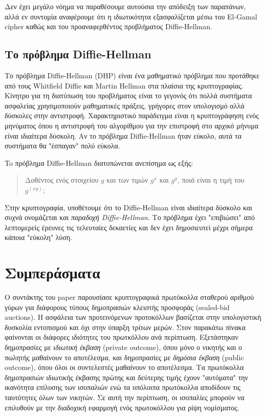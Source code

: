 \documentclass[letterpaper,11pt]{article}
\begin{document}
Δεν έχει μεγάλο νόημα να παραθέσουμε αυτούσια την απόδειξη των παραπάνων, αλλά εν συντομία αναφέρουμε ότι η ιδιωτικότητα εξασφαλίζεται μέσω του
El-Gamal cipher καθώς και του προαναφερθέντος προβλήματος Diffie-Hellman.

\subsection{Το πρόβλημα Diffie-Hellman}

Το πρόβλημα Diffie-Hellman (DHP) είναι ένα μαθηματικό πρόβλημα που προτάθηκε από τους Whitfield Diffie και Martin Hellman στα πλαίσια της
κρυπτογραφίας. Κίνητρο για τη διατύπωση του προβλήματος είναι το γεγονός ότι πολλά συστήματα ασφαλείας χρησιμοποιούν μαθηματικές πράξεις, γρήγορες
στον υπολογισμό αλλά δύσκολες στην αντιστροφή. Χαρακτηριστικό παράδειγμα είναι η κρυπτογράφηση ενός μηνύματος όπου η αντιστροφή του αλγορίθμου για
την επιστροφή στο αρχικό μήνυμα είναι ιδιαίτερα δύσκολη. Αν το πρόβλημα Diffie-Hellman ήταν εύκολο, αυτά τα συστήματα θα "έσπαγαν" πολύ εύκολα.

To πρόβλημα Diffie-Hellman διατυπώνεται ανεπίσημα ως εξής:

 \begin{quote} Δοθέντος ενός στοιχείου $g$ και των τιμών $g^x$ και $g^y$, ποιά είναι η τιμή του $g^(xy)$; \end{quote}

Στην κρυπτογραφία, υποθέτουμε ότι το Diffie-Hellman είναι ιδιαίτερα δύσκολο και συχνά ονομάζεται και \emph{παραδοχή Diffie-Hellman}. Το πρόβλημα
έχει "επιβιώσει" από λεπτομερείς έρευνες τις τελευταίες δεκαετίες και δεν έχει δημοσιευτεί μέχρι σήμερα κάποια "εύκολη" λύση.

	
\section{Συμπεράσματα} Ο συντάκτης του paper παρουσίασε κρυπτογραφικά πρωτόκολλα σταθερού αριθμού γύρων για διάφορους τύπους δημοπρασιών κλειστής
προσφοράς (sealed-bid auctions). Η ασφάλεια των προτεινόμενων προτοκόλλων βασίζεται στην υπολογιστική δυσκολία εντοπισμού και όχι στην ύπαρξη
τρίτων μερών. Στον παρακάτω πίνακα φαίνονται οι διάφορες ιδιότητες του πρωτκόλλου ανά περίπτωση. Εξετάστηκαν δημοπρασίες με \emph{ιδιωτική έκβαση}
(private outcome), όπου μόνο ο νικητής και ο πωλητής μαθαίνουν το αποτέλεσμα, και δημοπρασίες με \emph{δημόσια έκβαση} (public outcome), όπου όλοι
οι συντελεστές μαθαίνουν το αποτέλεσμα. Τα πρωτόκολλα δημοπρασιών ιδιωτικής έκβασης πρώτης και δεύτερης τιμής έχουν "αυτόματα" την ικανότητα
επίλυσης των ισοπαλιών ενώ τα υπόλοιπα πρωτόκολλα αποδίδουν τις ταυτότητες όλων των νικητών. Σε αυτή την περίπτωση, οι ισοπαλίες μπορούν να
επιλυθούν με την διαδοχική εφαρμογή ενός πρωτοκόλλου για ρίψη νομίσματος.
\end{document}
